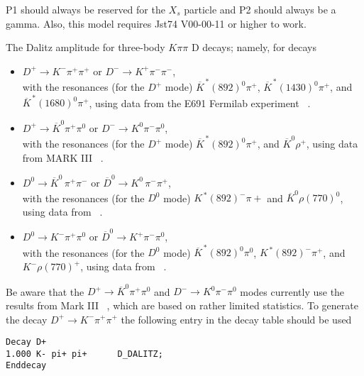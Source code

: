 \Notes
P1 should always be reserved for the $X_{s}$ particle and P2 should
always be a gamma. Also, this model requires Jst74 V00-00-11 or higher 
to work. 


\label{dplusdalitz}



\Expl
The Dalitz amplitude for three-body $K \pi \pi$ D decays; namely, for decays 
\begin{itemize}
\item
$D^+\rightarrow K^- \pi^+ \pi^+$ or $D^-\rightarrow K^+ \pi^- \pi^-$,\\
with the resonances (for the $D^{+}$ mode) $\overline{K}^{\,\ast}(892)^{0}\pi^{+}$, $\overline{K}^{\,\ast}(1430)^{0}\pi^{+}$, and $\overline{K}^{\,\ast}(1680)^{0}\pi^{+}$, using data from the E691 Fermilab experiment ~\cite{Anjos93}.
\item
$D^+\rightarrow \overline{K}^{0} \pi^+ \pi^0$ or $D^-\rightarrow K^0 \pi^- \pi^0$,\\
with the resonances (for the $D^{+}$ mode) $\overline{K}^{\,\ast}(892)^{0}\pi^{+}$, and $\overline{K}^{0}\rho^{+}$, using data from MARK III ~\cite{Adler87}. 
\item
$D^0\rightarrow \overline{K}^0\, \pi^+ \pi^-$ or $\overline{D}^0\rightarrow K^0\, \pi^- \pi^+$,\\
with the resonances (for the $D^{0}$ mode) $K^{\,\ast}(892)^{-} \pi{+}$ and $\overline{K}^{0} \rho(770)^{0}$, using data from ~\cite{Anjos93}. 
\item
$D^0\rightarrow K^{-} \pi^+ \pi^0$ or $\overline{D}^0\rightarrow K^+ \pi^- \pi^0$,\\
with the resonances (for the $D^{0}$ mode) $\overline{K}^{\,\ast}(892)^{0}\pi^{0}$, $K^{\,\ast}(892)^{-}\pi^{+}$, and $K^{-}\rho(770)^{+}$, using data from ~\cite{Anjos93}. 
\end{itemize}

Be aware that the $D^+\rightarrow \overline{K}^{0} \pi^+ \pi^0$ and $D^-\rightarrow K^0 \pi^- \pi^0$ modes currently use the results from Mark III ~\cite{Adler87}, which are based on rather limited statistics.    
\Example
To generate the decay $D^+\rightarrow K^- \pi^+ \pi^+$ the 
following entry in the decay table should be used
\begin{verbatim}
Decay D+
1.000 K- pi+ pi+      D_DALITZ;
Enddecay
\end{verbatim}

